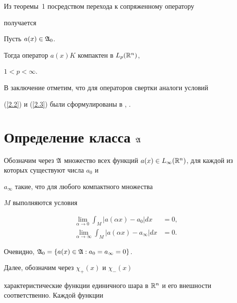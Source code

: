 Из теоремы~1 посредством перехода к сопряженному оператору


получается





\begin{thm}


Пусть $a(x)\in\frak A_0$.


Тогда оператор $a(x)K$ компактен в $L_p(\Bbb R^n)$,


$1<p<\infty$.


\end{thm}





В заключение отметим, что для операторов свертки аналоги условий


(\ref{2.2}) и (\ref{2.3}) были сформулированы в \cite{b5}, \cite{b6}.





\section{Определение класса $\frak A$}





Обозначим через $\frak A$ множество всех функций $a(x)\in


L_\infty(\Bbb R^n)$, для каждой из которых существуют числа $a_0$ и


$a_\infty$ такие, что для любого компактного множества


$M$ выполняются условия


\begin{align*}


\lim_{\alpha\to 0}\int_M |a(\alpha x)-a_0|dx&=0,\\


\lim_{\alpha\to \infty}\int_M |a(\alpha x)-a_\infty|dx&=0.


\end{align*}


Очевидно, $\frak A_0=\{a(x)\in\frak A: a_0=a_\infty=0\}$.





Далее, обозначим через $\chi_+(x)$ и $\chi_-(x)$


характеристические функции единичного шара в $\Bbb


R^n$ и его внешности соответственно. Каждой функции


